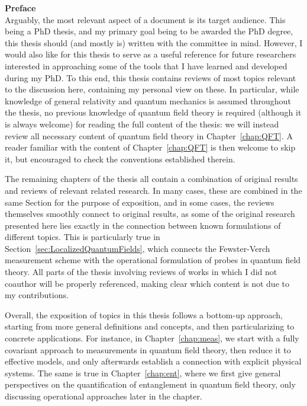 {\Huge\noindent\textbf{Preface}}\\

\noindent Arguably, the most relevant aspect of a document is its target audience. This being a PhD thesis, and my primary goal being to be awarded the PhD degree, this thesis should (and mostly is) written with the committee in mind. However, I would also like for this thesis to serve as a useful reference for future researchers interested in approaching some of the tools that I have learned and developed during my PhD. To this end, this thesis contains reviews of most topics relevant to the discussion here, containing my personal view on these. In particular, while knowledge of general relativity and quantum mechanics is assumed throughout the thesis, no previous knowledge of quantum field theory is required (although it is always welcome) for reading the full content of the thesis: we will instead review all necessary content of quantum field theory in Chapter~\ref{chap:QFT}. A reader familiar with the content of Chapter~\ref{chap:QFT} is then welcome to skip it, but encouraged to check the conventions established therein.

The remaining chapters of the thesis all contain a combination of original results and reviews of relevant related research. In many cases, these are combined in the same Section for the purpose of exposition, and in some cases, the reviews themselves smoothly connect to original results, as some of the original research presented here lies exactly in the connection between known formulations of different topics. This is particularly true in Section~\ref{sec:LocalizedQuantumFields}, which connects the Fewster-Verch measurement scheme with the operational formulation of probes in quantum field theory. All parts of the thesis involving reviews of works in which I did not coauthor will be properly referenced, making clear which content is not due to my contributions.

Overall, the exposition of topics in this thesis follows a bottom-up approach, starting from more general definitions and concepts, and then particularizing to concrete applications. For instance, in Chapter~\ref{chap:meas}, we start with a fully covariant approach to measurements in quantum field theory, then reduce it to effective models, and only afterwards establish a connection with explicit physical systems. The same is true in Chapter~\ref{chap:ent}, where we first give general perspectives on the quantification of entanglement in quantum field theory, only discussing operational approaches later in the chapter.

